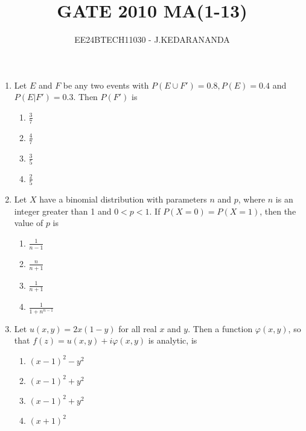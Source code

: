 \documentclass[journal]{IEEEtran}
\renewcommand{\thefigure}{\theenumi}
\renewcommand{\thetable}{\theenumi}
\numberwithin{equation}{enumi}
\numberwithin{figure}{enumi}
\renewcommand{\thetable}{\theenumi}
\begin{document}

\vspace{3cm}

\title{GATE 2010 MA(1-13)}
\author{EE24BTECH11030 - J.KEDARANANDA}
{\let\newpage\relax\maketitle}
\renewcommand{\thefigure}{\theenumi}
\renewcommand{\thetable}{\theenumi}
\begin{enumerate}
    \item Let $E$ and $F$ be any two events with $P(E \cup F') = 0.8, P(E) = 0.4$ and $P(E|F') = 0.3$. Then $P(F')$ is
    
    \begin{multicols}{4}
    \begin{enumerate}
        \item $\frac{3}{7}$
        \item $\frac{4}{7}$
        \item $\frac{3}{5}$
        \item $\frac{2}{5}$
    \end{enumerate}
    \end{multicols}

    \item Let $X$ have a binomial distribution with parameters $n$ and $p$, where $n$ is an integer greater than 1 and $0 < p < 1$. If $P(X = 0) = P(X = 1)$, then the value of $p$ is

    \begin{multicols}{4}
    \begin{enumerate}
        \item $\frac{1}{n-1}$
        \item $\frac{n}{n+1}$
        \item $\frac{1}{n+1}$
        \item $\frac{1}{1 + n^{n-1}}$
    \end{enumerate}
    \end{multicols}

    \item Let $u(x, y) = 2x(1 - y)$ for all real $x$ and $y$. Then a function $\varphi(x, y)$, so that $f(z) = u(x, y) + i\varphi(x, y)$ is analytic, is

    \begin{multicols}{4}
    \begin{enumerate}
        \item $(x - 1)^2 - y^2$
        \item $(x - 1)^2 + y^2$
        \item $(x - 1)^2 + y^2$
        \item $(x + 1)^2$
    \end{enumerate}
    \end{multicols}


\end{enumerate}
\end{document}

